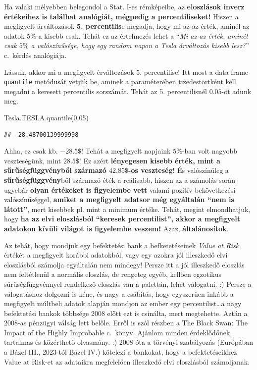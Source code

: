 \documentclass[
]{book}
\newenvironment{Shaded}{\begin{snugshade}}{\end{snugshade}}
\newcommand{\FloatTok}[1]{\textcolor[rgb]{0.00,0.00,0.81}{#1}}
\newcommand{\NormalTok}[1]{#1}
\begin{document}
Ha valaki mélyebben belegondol a Stat. I-es rémképeibe, az \textbf{eloszlások inverz értékeihez is találhat analógiát, mégpedig a percentiliseket!} Hiszen a megfigyelt árváltozások \textbf{5. percentilis}e megadja, hogy mi az az érték, aminél az adatok \(5\%\)-a kisebb csak. Tehát ez az értelmezés lehet a ``\emph{Mi az az érték, aminél csak \(5\%\) a valószínűsége, hogy egy random napon a Tesla árváltozás kisebb lesz?}'' c.~kérdés analógiája.

Lássuk, akkor mi a megfigyelt érváltozások 5. percentilise! Itt most a data frame \texttt{quantile} metódusát vetjük be, aminek a paraméterében tizedestörtként kell megadni a keresett percentilis sorszámát. Tehát az 5. percentilisnél \(0.05\)-öt adunk meg.

\begin{Shaded}
\begin{Highlighting}[]
\NormalTok{Tesla.TESLA.quantile(}\FloatTok{0.05}\NormalTok{)}
\end{Highlighting}
\end{Shaded}

\begin{verbatim}
## -28.48700139999998
\end{verbatim}

Ahha, ez csak kb. \(-28.5\$\)! Tehát a megfigyelt napjaink \(5\%\)-ban volt nagyobb veszteségünk, mint \(28.5\$\)! Ez azért \textbf{lényegesen kisebb érték, mint a sűrűségfüggvényből származó \(42.85\$\)-os veszteség!} És valószínűleg a \textbf{sűrűségfüggvény}ből származó éték a reálisabb, hiszen az a számolás során ugyebár \textbf{olyan értékeket is figyelembe vett} valami pozitív bekövetkezési valószínűséggel, \textbf{amiket a megfigyelt adatsor még egyáltalán ``nem is látott''}, mert kisebbek pl. mint a minimum értéke.
Tehát, megint elmondhatjuk, hogy \textbf{ha az elvi eloszlásból ``keresek percentilist'', akkor a megfigyelt adatokon kívüli világot is figyelembe veszem!} Azaz, \textbf{általánosítok}.

Az tehát, hogy mondjuk egy befektetési bank a befketetéseinek \emph{Value at Risk} értékét a megfigyelt korábbi adatokból, vagy egy azokra jól illeszkedő elvi eloszlásból számolja egyáltalán nem mindegy! Persze itt a jól illeszkedő eloszlás nem feltétlenül a normális eloszlás, de rengeteg egyéb, kellően egzotikus sűrűségfüggvénnyel rendelkező eloszlás van a palettán, lehet válogatni. :)
Persze a válogatáshoz dolgozni is kéne, és nagy a csábítás, hogy egyszerűen inkább a megfigyelt múltbeli adatok alapján mondjon az ember egy percentilist\ldots a nagy befektetési bankok többsége 2008 előtt ezt is csinálta, mert megtehette. Aztán a 2008-as pénzügyi válság lett belőle. Erről is szól részben a The Black Swan: The Impact of the Highly Improbable c.~könyv. Ajánlom minden érdeklődőnek, tartalmas és közérthető olvasmány. :)
2008 óta a törvényi szabályozás (Európában a Bázel III., 2023-tól Bázel IV.) kötelezi a bankokat, hogy a befektetéseikhez Value at Risk-et az adataikra megfelelően illeszkedő elvi eloszlásból számoljanak.
\end{document}
